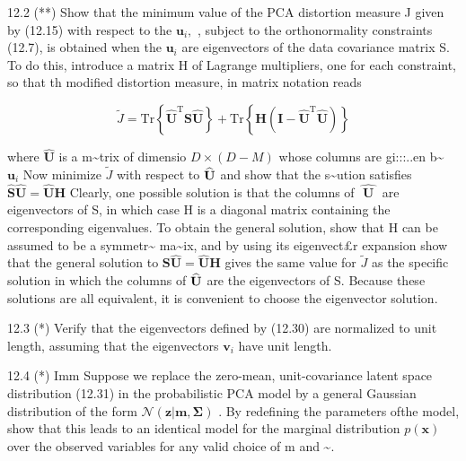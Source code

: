 \documentclass[
  10
]{article}
\begin{document}
12.2 (**) Show that the minimum value of the PCA distortion measure J
given by (12.15) with respect to the \(\mathbf { u } _ { i } ,\) ,
subject to the orthonormality constraints (12.7), is obtained when the
\(\mathbf { u } _ { i }\) are eigenvectors of the data covariance matrix
S. To do this, introduce a matrix H of Lagrange multipliers, one for
each constraint, so that th modified distortion measure, in matrix
notation reads

\[
\widetilde {J} = \mathrm{Tr} \left\{\widehat {\mathbf {U}} ^ {\mathrm{T}} \mathbf {S} \widehat {\mathbf {U}} \right\} + \mathrm{Tr} \left\{\mathbf {H} (\mathbf {I} - \widehat {\mathbf {U}} ^ {\mathrm{T}} \widehat {\mathbf {U}}) \right\}\tag{12.93}
\]

where \(\widehat { \mathbf { U } }\) is a m\textasciitilde trix of
dimensio \(D \times ( D - M )\) whose columns are gi:::..en
b\textasciitilde{} \(\mathbf { u } _ { i }\) Now minimize
\(\widetilde { J }\) with respect to \(\widehat { \bf U }\) and show
that the s\textasciitilde ution satisfies
\(\widehat { \mathbf { S } } \widehat { \mathbf { U } } = \widehat { \mathbf { U } } \mathbf { H }\)
Clearly, one possible solution is that the columns of
\(\widehat { \textbf { U } }\) are eigenvectors of S, in which case H is
a diagonal matrix containing the corresponding eigenvalues. To obtain
the general solution, show that H can be assumed to be a
symmetr\textasciitilde{} ma\textasciitilde ix, and by using its
eigenvect£r expansion show that the general solution to
\(\mathbf { S \widehat { U } } = \widehat { \mathbf { U } } \mathbf { H }\)
gives the same value for \(\widetilde { J }\) as the specific solution
in which the columns of \(\widehat { \bf U }\) are the eigenvectors of
S. Because these solutions are all equivalent, it is convenient to
choose the eigenvector solution.

12.3 (*) Verify that the eigenvectors defined by (12.30) are normalized
to unit length, assuming that the eigenvectors \(\mathbf { v } _ { i }\)
have unit length.

12.4 (*) Imm Suppose we replace the zero-mean, unit-covariance latent
space distribution (12.31) in the probabilistic PCA model by a general
Gaussian distribution of the form
\(\mathcal { N } ( \mathbf { z } | \mathbf { m } , \pmb { \Sigma } )\) .
By redefining the parameters ofthe model, show that this leads to an
identical model for the marginal distribution \(p ( \mathbf { x } )\)
over the observed variables for any valid choice of m and
\textasciitilde.
\end{document}
